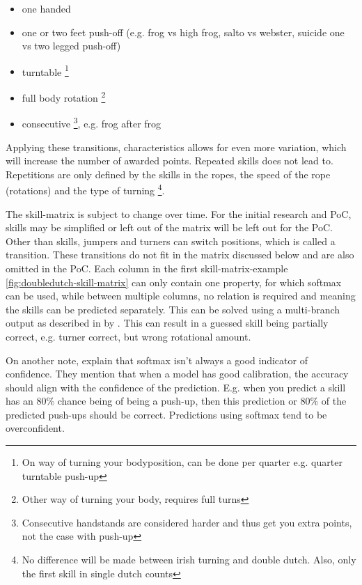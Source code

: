 \begin{itemize}
    \item one handed
    \item one or two feet push-off (e.g. frog vs high frog, salto vs webster, suicide one vs two legged push-off)
    \item turntable \footnote{On way of turning your bodyposition, can be done per quarter e.g. quarter turntable push-up}
    \item full body rotation \footnote{Other way of turning your body, requires full turns}
    \item consecutive \footnote{Consecutive handstands are considered harder and thus get you extra points, not the case with push-up}, e.g. frog after frog
\end{itemize}

Applying these transitions, characteristics allows for even more variation, which will increase the number of awarded points. Repeated skills does not lead to. Repetitions are only defined by the skills in the ropes, the speed of the rope (rotations) and the type of turning \footnote{No difference will be made between irish turning and double dutch. Also, only the first skill in single dutch counts}.

\medskip

The skill-matrix is subject to change over time. For the initial research and PoC, skills may be simplified or left out of the matrix will be left out for the PoC. Other than skills, jumpers and turners can switch positions, which is called a transition. These transitions do not fit in the matrix discussed below and are also omitted in the PoC.
Each column in the first skill-matrix-example \ref{fig:doubledutch-skill-matrix} can only contain one property, for which softmax can be used, while between multiple columns, no relation is required and meaning the skills can be predicted separately. This can be solved using a multi-branch output as described in by \textcite{Coulibaly_2022}. This can result in a guessed skill being partially correct, e.g. turner correct, but wrong rotational amount.




On another note, \textcite{Guo_2017} explain that softmax isn't always a good indicator of confidence. They mention that when a model has good calibration, the accuracy should align with the confidence of the prediction. E.g. when you predict a skill has an 80\% chance being of being a push-up, then this prediction or 80\% of the predicted push-ups should be correct. Predictions using softmax tend to be overconfident.



